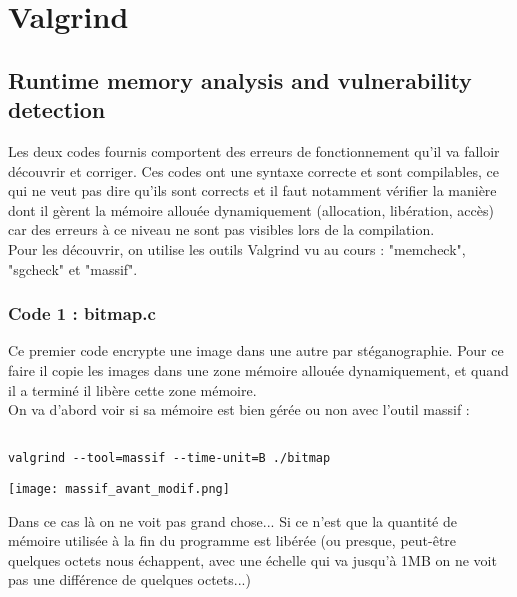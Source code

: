 
\chapter{Valgrind} %

\label{Chapitre 4.1} %




\section{Runtime memory analysis and vulnerability detection}
Les deux codes fournis comportent des erreurs de fonctionnement qu'il va falloir découvrir et corriger. Ces codes ont une syntaxe correcte et sont compilables, ce qui ne veut pas dire qu'ils sont corrects et il faut notamment vérifier la manière dont il gèrent la mémoire allouée dynamiquement (allocation, libération, accès) car des erreurs à ce niveau ne sont pas visibles lors de la compilation.\\
Pour les découvrir, on utilise les outils Valgrind vu au cours : "memcheck", "sgcheck" et "massif".

\subsection{Code 1 : bitmap.c}
Ce premier code encrypte une image dans une autre par stéganographie. Pour ce faire il copie les images dans une zone mémoire allouée dynamiquement, et quand il a terminé il libère cette zone mémoire.\\

On va d'abord voir si sa mémoire est bien gérée ou non avec l'outil massif :
\begin{lstlisting}[frame=single,style=Console]  % Start your code-block

valgrind --tool=massif --time-unit=B ./bitmap
\end{lstlisting}

\begin{center} 
\hspace{15cm}
\texttt{[image: massif\_avant\_modif.png]}
\end{center}
\vspace{0.5cm}
Dans ce cas là on ne voit pas grand chose... Si ce n'est que la quantité de mémoire utilisée à la fin du programme est libérée (ou presque, peut-être quelques octets nous échappent, avec une échelle qui va jusqu'à 1MB on ne voit pas une différence de quelques octets...)\\

